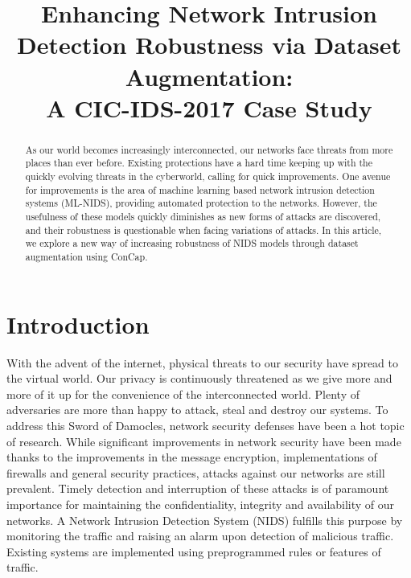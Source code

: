 \documentclass[conference]{IEEEtran}
\begin{document}
	
	\title{Enhancing Network Intrusion Detection Robustness via Dataset Augmentation:\\ A CIC-IDS-2017 Case Study}
	
	\author{
	}

	\maketitle
	\pagestyle{plain}
	
	\begin{abstract}
		As our world becomes increasingly interconnected, our networks face threats from more places than ever before. Existing protections have a hard time keeping up with the quickly evolving threats in the cyberworld, calling for quick improvements. One avenue for improvements is the area of machine learning based network intrusion detection systems (ML-NIDS), providing automated protection to the networks. However, the usefulness of these models quickly diminishes as new forms of attacks are discovered, and their robustness is questionable when facing variations of attacks. In this article, we explore a new way of increasing robustness of NIDS models through dataset augmentation using ConCap.
	\end{abstract}
	
	\section{Introduction}
	With the advent of the internet, physical threats to our security have spread to the virtual world. Our privacy is continuously threatened as we give more and more of it up for the convenience of the interconnected world. Plenty of adversaries are more than happy to attack, steal and destroy our systems. To address this Sword of Damocles, network security defenses have been a hot topic of research. While significant improvements in network security have been made thanks to the improvements in the message encryption, implementations of firewalls and general security practices, attacks against our networks are still prevalent. Timely detection and interruption of these attacks is of paramount importance for maintaining the confidentiality, integrity and availability of our networks. A Network Intrusion Detection System (NIDS) fulfills this purpose by monitoring the traffic and raising an alarm upon detection of malicious traffic. Existing systems \cite{snort, suricata, zeek} are implemented using preprogrammed rules or features of traffic. 
	
\end{document}

